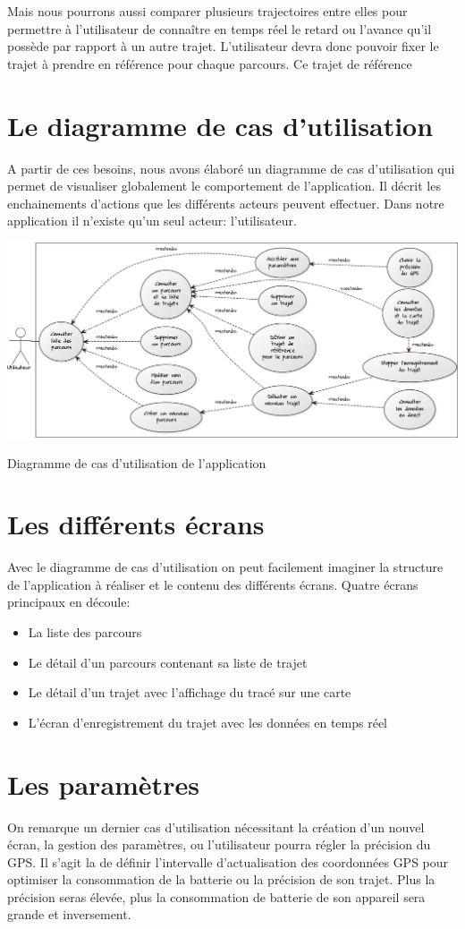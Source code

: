 Mais nous pourrons aussi comparer plusieurs trajectoires entre elles pour permettre à l'utilisateur de connaître en temps réel le retard ou l'avance qu'il possède par rapport à un autre trajet. L'utilisateur devra donc pouvoir fixer le trajet à prendre en référence pour chaque parcours. Ce trajet de référence

\section{Le diagramme de cas d'utilisation}
A partir de ces besoins, nous avons élaboré un diagramme de cas d'utilisation qui permet de visualiser globalement le comportement de l'application. Il décrit les enchainements d'actions que les différents acteurs peuvent effectuer. Dans notre application il n'existe qu'un seul acteur: l'utilisateur.

\begin{img}
  \includegraphics[scale=0.35]{img/DUC.png}
  \caption{Diagramme de cas d'utilisation de l'application}
\end{img}

\section{Les différents écrans}
Avec le diagramme de cas d'utilisation on peut facilement imaginer la structure de l'application à réaliser et le contenu des différents écrans. Quatre écrans principaux en découle:\bigskip

\begin{itemize}
  \item La liste des parcours
  \item Le détail d'un parcours contenant sa liste de trajet
  \item Le détail d'un trajet avec l'affichage du tracé sur une carte
  \item L'écran d'enregistrement du trajet avec les données en temps réel 
\end{itemize}\bigskip

\section{Les paramètres}
On remarque un dernier cas d'utilisation nécessitant la création d'un nouvel écran, la gestion des paramètres, ou l'utilisateur pourra régler la précision du GPS. Il s'agit la de définir l'intervalle d'actualisation des coordonnées GPS pour optimiser la consommation de la batterie ou la précision de son trajet. Plus la précision seras élevée, plus la consommation de batterie de son appareil sera grande et inversement.
 